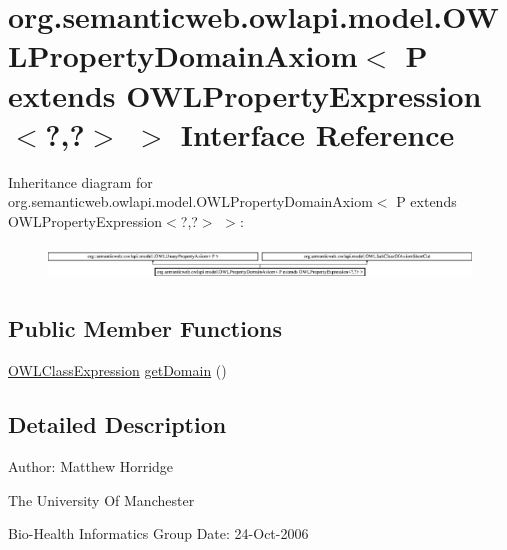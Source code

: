 \hypertarget{interfaceorg_1_1semanticweb_1_1owlapi_1_1model_1_1_o_w_l_property_domain_axiom_3_01_p_01extends_d1b0dc6247c6225898c4a4edc4291fb6}{\section{org.\-semanticweb.\-owlapi.\-model.\-O\-W\-L\-Property\-Domain\-Axiom$<$ P extends O\-W\-L\-Property\-Expression$<$?,?$>$ $>$ Interface Reference}
\label{interfaceorg_1_1semanticweb_1_1owlapi_1_1model_1_1_o_w_l_property_domain_axiom_3_01_p_01extends_d1b0dc6247c6225898c4a4edc4291fb6}
}
Inheritance diagram for org.\-semanticweb.\-owlapi.\-model.\-O\-W\-L\-Property\-Domain\-Axiom$<$ P extends O\-W\-L\-Property\-Expression$<$?,?$>$ $>$\-:\begin{figure}[H]
\begin{center}
\leavevmode
\includegraphics[height=0.925620cm]{interfaceorg_1_1semanticweb_1_1owlapi_1_1model_1_1_o_w_l_property_domain_axiom_3_01_p_01extends_d1b0dc6247c6225898c4a4edc4291fb6}
\end{center}
\end{figure}
\subsection*{Public Member Functions}
\begin{DoxyCompactItemize}
\item 
\hyperlink{interfaceorg_1_1semanticweb_1_1owlapi_1_1model_1_1_o_w_l_class_expression}{O\-W\-L\-Class\-Expression} \hyperlink{interfaceorg_1_1semanticweb_1_1owlapi_1_1model_1_1_o_w_l_property_domain_axiom_3_01_p_01extends_d1b0dc6247c6225898c4a4edc4291fb6_aa8d2d9fe1f1eae54acdff73dd8aa2a77}{get\-Domain} ()
\end{DoxyCompactItemize}


\subsection{Detailed Description}
Author\-: Matthew Horridge\par
 The University Of Manchester\par
 Bio-\/\-Health Informatics Group Date\-: 24-\/\-Oct-\/2006 

